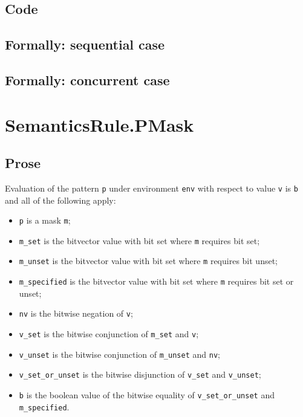 \documentclass{book}
\begin{document}
  \subsection{Code}

\begin{emptyformal}
  \subsection{Formally: sequential case}

  \subsection{Formally: concurrent case}
\end{emptyformal}


\section{SemanticsRule.PMask \label{sec:SemanticsRule.PMask}}

    \subsection{Prose}
    Evaluation of the pattern \texttt{p} under environment \texttt{env} with
    respect to value \texttt{v} is \texttt{b} and all of the following apply:
    \begin{itemize}
      \item \texttt{p} is a mask \texttt{m};
      \item \texttt{m\_set} is the bitvector value with bit set where \texttt{m}
        requires bit set;
      \item \texttt{m\_unset} is the bitvector value with bit set where
        \texttt{m} requires bit unset;
      \item \texttt{m\_specified} is the bitvector value with bit set where
        \texttt{m} requires bit set or unset;
      \item \texttt{nv} is the bitwise negation of \texttt{v};
      \item \texttt{v\_set} is the bitwise conjunction of \texttt{m\_set} and
        \texttt{v};
      \item \texttt{v\_unset} is the bitwise conjunction of \texttt{m\_unset} and
        \texttt{nv};
      \item \texttt{v\_set\_or\_unset} is the bitwise disjunction of
        \texttt{v\_set} and \texttt{v\_unset};
      \item \texttt{b} is the boolean value of the bitwise equality of
        \texttt{v\_set\_or\_unset} and \texttt{m\_specified}.
    \end{itemize}
\end{document}
